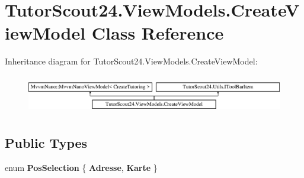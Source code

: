 \hypertarget{class_tutor_scout24_1_1_view_models_1_1_create_view_model}{}\section{Tutor\+Scout24.\+View\+Models.\+Create\+View\+Model Class Reference}
\label{class_tutor_scout24_1_1_view_models_1_1_create_view_model}
Inheritance diagram for Tutor\+Scout24.\+View\+Models.\+Create\+View\+Model\+:\begin{figure}[H]
\begin{center}
\leavevmode
\includegraphics[height=1.723077cm]{class_tutor_scout24_1_1_view_models_1_1_create_view_model}
\end{center}
\end{figure}
\subsection*{Public Types}
\begin{DoxyCompactItemize}
\item 
\mbox{\label{class_tutor_scout24_1_1_view_models_1_1_create_view_model_a2cdbfdb58688e57fa4a3f6a24cf6af68}} 
enum {\bfseries Pos\+Selection} \{ {\bfseries Adresse}, 
{\bfseries Karte}
 \}
\end{DoxyCompactItemize}
